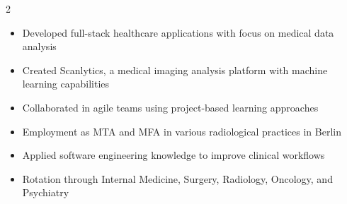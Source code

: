 \documentclass[10pt,a4paper,ragged2e,withhyper]{altacv}
\begin{document}

\makecvheader


\begin{paracol}{2}



\begin{itemize}
\item Developed full-stack healthcare applications with focus on medical data analysis
\item Created Scanlytics, a medical imaging analysis platform with machine learning capabilities
\item Collaborated in agile teams using project-based learning approaches
\end{itemize}

\divider

\begin{itemize}
\item Employment as MTA and MFA in various radiological practices in Berlin
\item Applied software engineering knowledge to improve clinical workflows
\end{itemize}

\divider

\begin{itemize}
\item Rotation through Internal Medicine, Surgery, Radiology, Oncology, and Psychiatry
\end{itemize}

\divider


\end{paracol}
\end{document}
